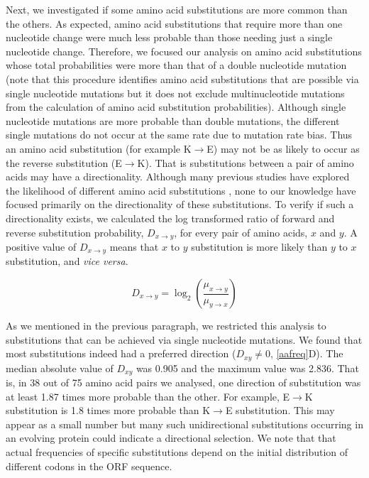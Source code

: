 \documentclass[12pt,a4paper]{article}
\newcommand{\cmnt}[1]{{\color{purple} #1}}
\begin{document}
Next, we investigated if some amino acid substitutions are more common than the others. As expected, amino acid substitutions that require more than one nucleotide change were much less probable than those needing just a single nucleotide change. Therefore, we focused our analysis on amino acid substitutions whose total probabilities were more than that of a double nucleotide mutation (note that this procedure identifies amino acid substitutions that are possible via single nucleotide mutations but it does not exclude multinucleotide mutations from the calculation of amino acid substitution probabilities). Although single nucleotide mutations are more probable than double mutations, the different single mutations do not occur at the same rate due to mutation rate bias. Thus an amino acid substitution (for example K$\to$E) may not be as likely to occur as the reverse substitution (E$\to$K). That is substitutions between a pair of amino acids may have a directionality. Although many previous studies have explored the likelihood of different amino acid substitutions \citep{aasubOhta,PAM,blosum,submat92,submat92j,submat01,submat05,submat07,submat08}, none to our knowledge have focused primarily on the directionality of these substitutions. To verify if such a directionality exists, we calculated the log transformed ratio of forward and reverse substitution probability, $D_{x\to y}$, for every pair of amino acids, $x$ and $y$. A positive value of $D_{x\to y}$ means that $x$ to $y$ substitution is more likely than $y$ to $x$ substitution, and \textit{vice versa}.

\begin{equation}
\textit{D}_{x\to y} = \log_2\left(\frac{\mu_{x\to y}}{\mu_{y\to x}}\right)
\label{directionality}
\end{equation}

As we mentioned in the previous paragraph, we restricted this analysis to substitutions that can be achieved via single nucleotide mutations. We found that most substitutions indeed had a preferred direction ($\textit{D}_{xy} \neq 0$,  \autoref{aafreq}{\color{blue}D}). The median absolute value of $\textit{D}_{xy}$ was 0.905 and the maximum value was 2.836. That is, in 38 out of 75 amino acid pairs we analysed, one direction of substitution was at least 1.87 times more probable than the other. For example, E$\to$K substitution is 1.8 times more probable than K$\to$E substitution. This may appear as a small number but many such unidirectional substitutions occurring in an evolving protein could indicate a directional selection. \cmnt{We note that that actual frequencies of specific substitutions depend on the initial distribution of different codons in the ORF sequence.}
\end{document}
